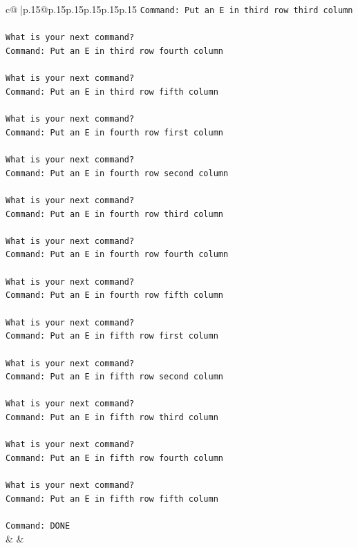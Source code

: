 \documentclass{article}
\begin{document}
{\begin{supertabular}{c@{$\;$}|p{.15\linewidth}@{}p{.15\linewidth}p{.15\linewidth}p{.15\linewidth}p{.15\linewidth}p{.15\linewidth}}
{{{\texttt{Command: Put an E in third row third column} \\
\\ 
\texttt{What is your next command?} \\
\texttt{Command: Put an E in third row fourth column} \\
\\ 
\texttt{What is your next command?} \\
\texttt{Command: Put an E in third row fifth column} \\
\\ 
\texttt{What is your next command?} \\
\texttt{Command: Put an E in fourth row first column} \\
\\ 
\texttt{What is your next command?} \\
\texttt{Command: Put an E in fourth row second column} \\
\\ 
\texttt{What is your next command?} \\
\texttt{Command: Put an E in fourth row third column} \\
\\ 
\texttt{What is your next command?} \\
\texttt{Command: Put an E in fourth row fourth column} \\
\\ 
\texttt{What is your next command?} \\
\texttt{Command: Put an E in fourth row fifth column} \\
\\ 
\texttt{What is your next command?} \\
\texttt{Command: Put an E in fifth row first column} \\
\\ 
\texttt{What is your next command?} \\
\texttt{Command: Put an E in fifth row second column} \\
\\ 
\texttt{What is your next command?} \\
\texttt{Command: Put an E in fifth row third column} \\
\\ 
\texttt{What is your next command?} \\
\texttt{Command: Put an E in fifth row fourth column} \\
\\ 
\texttt{What is your next command?} \\
\texttt{Command: Put an E in fifth row fifth column} \\
\\ 
\texttt{Command: DONE} \\
            }
        }
    }
    & & \\ \\


\end{supertabular}}
\end{document}
